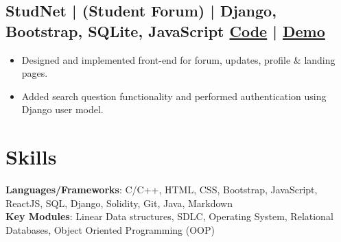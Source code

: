 \documentclass[a4,10pt]{article}
\newenvironment{zitemize}{
\begin{itemize}\itemsep0pt \parskip0pt \parsep1pt}
{\end{itemize}\vspace{-0.5cm}}
\begin{document}
\subsection*{StudNet {\normalsize\normalfont | (Student Forum) | Django, Bootstrap, SQLite, JavaScript} \hfill {\href{https://github.com/DevelopersLeague/StudNet}{Code} }|  {\href{https://stud-net.herokuapp.com/}{Demo} }} 
    \begin{zitemize}
        \item Designed and implemented front-end for forum, updates, profile \& landing pages.
        \item Added search question functionality and performed authentication using Django user model.
    \end{zitemize}

\vspace{0.1cm}

        




\section{Skills}
\textbf{Languages/Frameworks}: C/C++, HTML, CSS, Bootstrap, JavaScript, ReactJS, SQL, Django, Solidity, Git, Java, Markdown \\ 
\textbf{Key Modules}: Linear Data structures, SDLC, Operating System, Relational Databases, Object Oriented Programming (OOP)
\vspace{-0.2cm}
\end{document}
